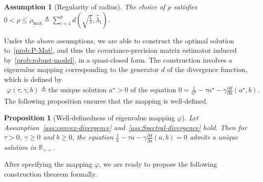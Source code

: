 \documentclass[11pt]{article}
\def\R{\mathbb{R}}
\newtheorem{proposition}{Proposition}
\newtheorem{assumption}{Assumption}
\newcommand{\opt}{^\star}
\newcommand{\Let}{\triangleq}
\def\R{\mathbb{R}}
\begin{document}
\begin{assumption}[Regularity of radius]\label{ass:reg-radius}
    The choice of $ \rho$ satisfies $0<  \rho \leq  \rho_{\max}\Let \sum_{i=1}^p d\left(\sqrt{\frac{1}{\tau}},\widehat{\lambda}_i\right)$. 
\end{assumption}

Under the above assumptions, we are able to construct the optimal solution to~\eqref{prob:P-Mat}, and thus the covariance-precision matrix estimator induced by~\eqref{prob:robust-model}, in a quasi-closed form. The construction involves a eigenvalue mapping corresponding to the generator $d$ of the divergence function, which is defined by
\begin{align}\label{eq:def-varphi}
\varphi(\tau, \gamma, b) \Let \text{the unique solution $a\opt> 0$ of the equation } 0 = \frac{1}{a\opt}-\tau a\opt -\gamma \frac{\partial d}{\partial a} (a\opt, b).
\end{align}
The following proposition ensures that the mapping is well-defined.
\begin{proposition}[Well-definedness of eigenvalue mapping $\varphi$]\label{prop:unique-varphi}
    Let Assumption~\ref{ass:convex-divergence} and~\ref{ass:Spectral-divergence} hold. Then for $\tau>0$, $\gamma\geq 0$ and $b\geq0$, the equation $\frac{1}{a}-\tau a-\gamma \frac{\partial d}{\partial a} (a, b)=0$ admits a unique solution in $\R_{++}$.
\end{proposition}



After specifying the mapping $\varphi$, we are ready to propose the following construction theorem formally.
\end{document}
